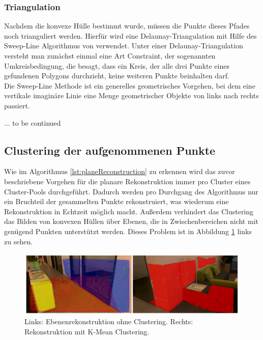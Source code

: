 \subsubsection{Triangulation}

Nachdem die konvexe Hülle bestimmt wurde, müssen die Punkte dieses Pfades noch trianguliert werden. Hierfür wird eine Delaunay-Triangulation mit Hilfe des Sweep-Line Algorithmus von \citet{domiter2008sweep} verwendet. Unter einer Delaunay-Triangulation versteht man zunächst einmal eine Art Constraint, der sogenannten Umkreisbedingung, die besagt, dass ein Kreis, der alle drei Punkte eines gefundenen Polygons durchzieht, keine weiteren Punkte beinhalten darf. \\

Die Sweep-Line Methode ist ein generelles geometrisches Vorgehen, bei dem eine vertikale imaginäre Linie eine Menge geometrischer Objekte von links nach rechts passiert. 

 ... to be continued

\subsection{Clustering der aufgenommenen Punkte}

Wie im Algorithmus \ref{lst:planeReconstruction} zu erkennen wird das zuvor beschriebene Vorgehen für die planare Rekonstruktion immer pro Cluster eines Cluster-Pools durchgeführt. Dadurch werden pro Durchgang des Algorithmus nur ein Bruchteil der gesammelten Punkte rekonstruiert, was wiederum eine Rekonstruktion in Echtzeit möglich macht. Außerdem verhindert das Clustering das Bilden von konvexen Hüllen über Ebenen, die in Zwischenbereichen nicht mit genügend Punkten unterstützt werden. Dieses Problem ist in Abbildung \ref{fig:clustering} links zu sehen.\\

\begin{figure}
  \centering
	\includegraphics[width=1.0\textwidth]{content/images/methods/clustering.png} 
  \caption{Links: Ebenenrekonstruktion ohne Clustering. Rechts: Rekonstruktion mit K-Mean Clustering.}
  \label{fig:clustering}
\end{figure}

